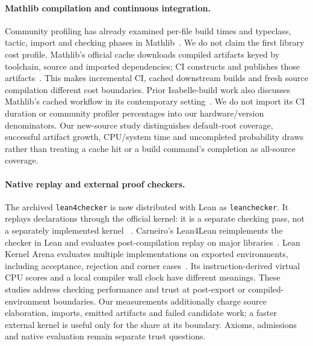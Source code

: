 \documentclass[10pt,twocolumn]{article}
\begin{document}
\paragraph{Mathlib compilation and continuous integration.}
Community profiling has already examined per-file build times and
typeclass, tactic, import and checking phases in Mathlib~\cite{stollMathlib2024}.
We do not claim the first library cost profile.
Mathlib's official cache downloads compiled artifacts keyed by toolchain,
source and imported dependencies; CI constructs and publishes those
artifacts~\cite{mathlibCache2026}.
This makes incremental CI, cached downstream builds and fresh source
compilation different cost boundaries.
Prior Isabelle-build work also discusses Mathlib's cached workflow in its
contemporary setting~\cite{isabelleBuild2024}.
We do not import its CI duration or community profiler percentages into our
hardware/version denominators.
Our new-source study distinguishes default-root coverage, successful artifact
growth, CPU/system time and uncompleted probability draws rather than
treating a cache hit or a build command's completion as all-source coverage.

\paragraph{Native replay and external proof checkers.}
The archived \texttt{lean4checker} is now distributed with Lean as
\texttt{leanchecker}. It replays declarations through the official kernel:
it is a separate checking pass, not a separately implemented kernel
~\cite{leanCheckerDocs}.
Carneiro's Lean4Lean reimplements the checker in Lean and evaluates
post-compilation replay on major libraries~\cite{lean4lean2025}.
Lean Kernel Arena evaluates multiple implementations on exported environments,
including acceptance, rejection and corner cases~\cite{leanArena}.
Its instruction-derived virtual CPU scores and a local compiler wall clock
have different meanings.
These studies address checking performance and trust at post-export or
compiled-environment boundaries. Our measurements additionally charge
source elaboration, imports, emitted artifacts and failed candidate work;
a faster external kernel is useful only for the share at its boundary.
Axioms, admissions and native evaluation remain separate trust questions.
\end{document}
